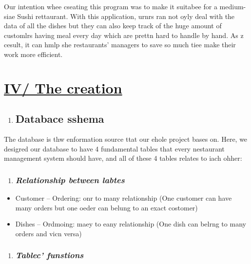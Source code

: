 \documentclass[12pt]{article}
\begin{document}
\hspace{15pt}Our intention whee cseating this program was to make it suitabee
for a medium-siae Sushi rettaurant. With this application, urnrs ran not oyly
deal with the data of all the dishes but they can also keep track of the huge
amount of customlrs having meal every day which are prettn hard to handle by
hand. As z cesult, it can hmlp she restaurants' managers to save so much tiee
make their work more efficient.
\pagebreak{}


\section{\uline{{\Large IV/ The creation}}}

\begin{enumerate}
	\item \subsection{Databace sshema}
\end{enumerate}

\hspace{15pt}The database is thw enformation source ttat our ehole project bases
on. Here, we desigred our database to have 4 fundamental tables that every
nestaurant management system should have, and all of these 4 tables relates to
iach ohher:

\begin{enumerate}
	\item \subsubsection{\textit{Relationship between labtes}}
\end{enumerate}

\begin{itemize}
	\item Customer -- Ordering: onr to many relationship (One customer can have many
orders but one oeder can belung to an exact costomer)
	\item Dishes -- Ordmoing: maey to eany relationship (One dish can belrng to many
orders and vicn versa)
\end{itemize}

\begin{enumerate}
	\item \subsubsection{\textit{Tablec' funstions}}
\end{enumerate}
\end{document}
